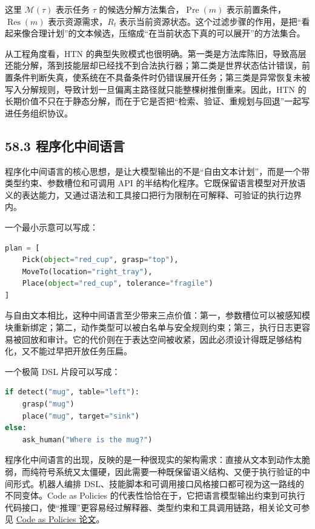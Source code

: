 这里 \(\mathcal{M}(\tau)\) 表示任务 \(\tau\) 的候选分解方法集合，\(\operatorname{Pre}(m)\) 表示前置条件，\(\operatorname{Res}(m)\) 表示资源需求，\(R_t\) 表示当前资源状态。这个过滤步骤的作用，是把“看起来像合理计划”的文本候选，压缩成“在当前状态下真的可以展开”的方法集合。

从工程角度看，HTN 的典型失败模式也很明确。第一类是方法库陈旧，导致高层还能分解，落到技能层却已经找不到合法执行器；第二类是世界状态估计错误，前置条件判断失真，使系统在不具备条件时仍错误展开任务；第三类是异常恢复未被写入分解规则，导致计划一旦偏离主路径就只能整棵树推倒重来。因此，HTN 的长期价值不只在于静态分解，而在于它是否把“检索、验证、重规划与回退”一起写进任务组织协议。

\subsection*{58.3 程序化中间语言}


程序化中间语言的核心思想，是让大模型输出的不是“自由文本计划”，而是一个带类型约束、参数槽位和可调用 API 的半结构化程序。它既保留语言模型对开放语义的表达能力，又通过语法和工具接口把行为限制在可解释、可验证的执行边界内。

一个最小示意可以写成：

\begin{lstlisting}[language=python]
plan = [
    Pick(object="red_cup", grasp="top"),
    MoveTo(location="right_tray"),
    Place(object="red_cup", tolerance="fragile")
]
\end{lstlisting}

与自由文本相比，这种中间语言至少带来三点价值：第一，参数槽位可以被感知模块重新绑定；第二，动作类型可以被白名单与安全规则约束；第三，执行日志更容易被回放和审计。它的代价则在于表达空间被收紧，因此必须设计得既足够结构化，又不能过早把开放任务压扁。

一个极简 DSL 片段可以写成：

\begin{lstlisting}[language=python]
if detect("mug", table="left"):
    grasp("mug")
    place("mug", target="sink")
else:
    ask_human("Where is the mug?")
\end{lstlisting}

程序化中间语言的出现，反映的是一种很现实的架构需求：直接从文本到动作太脆弱，而纯符号系统又太僵硬，因此需要一种既保留语义结构、又便于执行验证的中间形式。机器人编排 DSL、技能脚本和可调用接口风格接口都可视为这一路线的不同变体。Code as Policies 的代表性恰恰在于，它把语言模型输出约束到可执行代码接口，使“推理”更容易经过解释器、类型约束和工具调用链路，相关论文可参见 \href{https://arxiv.org/abs/2209.07753}{Code as Policies 论文}。

